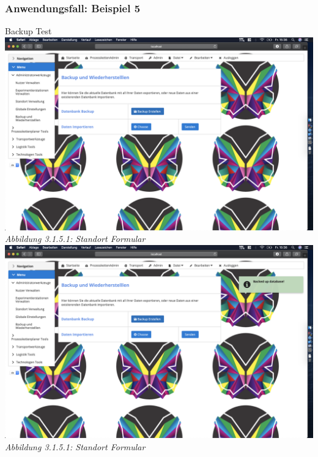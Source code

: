 \documentclass[enabledeprecatedfontcommands,fontsize=12pt,paper=a4,twoside]{scrartcl}
\begin{document}
\subsubsection{Anwendungsfall: Beispiel 5}

Backup Test
\hypertarget{sc3.1.5.1}{
\includegraphics[width=1\textwidth]{Screenshots/5BackFormular.png}
\textit{Abbildung 3.1.5.1: Standort Formular}
} \\


\hypertarget{sc3.1.5.1}{
\includegraphics[width=1\textwidth]{Screenshots/5BackGenerated.png}
\textit{Abbildung 3.1.5.1: Standort Formular}
} \\
\end{document}
